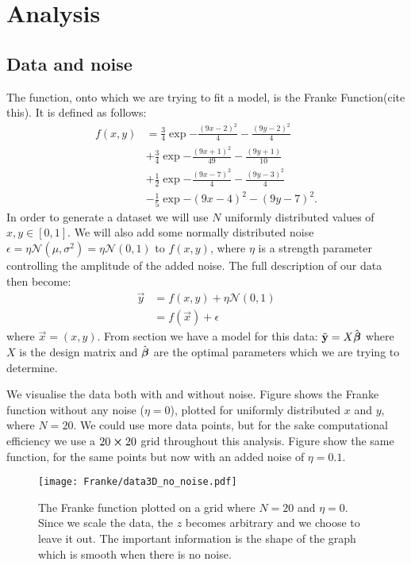 \section{Analysis}\label{sec:analysis}

    \subsection{Data and noise}\label{sec:data}
        The function, onto which we are trying to fit a model, is the Franke Function(cite this). It is defined as follows:
        \begin{align}\label{eq:francefunc}
            f(x,y) &= \frac{3}{4}\exp{-\frac{(9x-2)^2}{4}-\frac{(9y-2)^2}{4}} \nonumber\\
            &+ \frac{3}{4}\exp{-\frac{(9x+1)^2}{49}-\frac{(9y+1)}{10}} \nonumber\\
            &+ \frac{1}{2}\exp{-\frac{(9x-7)^2}{4}-\frac{(9y-3)^2}{4}} \nonumber\\
            &-\frac{1}{5}\exp{-(9x-4)^2-(9y-7)^2}.
        \end{align}
        In order to generate a dataset we will use $N$ uniformly distributed values of $x,y\in[0,1]$. We will also add some normally distributed noise $\epsilon = \eta\mathcal{N}(\mu,\sigma^2) = \eta\mathcal{N}(0,1)$ to $f(x,y)$, where $\eta$ is a strength parameter controlling the amplitude of the added noise. The full description of our data then become:
        \begin{align}\label{eq:datadescription}
            \vec{y} &= f(x,y) + \eta\mathcal{N}(0,1) \nonumber \\
            &= f(\vec{x}) + \epsilon
        \end{align}
        where $\vec{x} = (x,y)$. 
        From section  we have a model for this data: $\tilde{\mathbf{y}} = X\hat{\boldsymbol{\beta}}$ where $X$ is the design matrix and $\hat{\boldsymbol{\beta}}$ are the optimal parameters which we are trying to determine. 

        We visualise the data both with and without noise. Figure  shows the Franke function without any noise ($\eta=0$), plotted for uniformly distributed $x$ and $y$, where $N=20$. We could use more data points, but for the sake computational efficiency we use a $20\cross20$ grid throughout this analysis.  Figure  show the same function, for the same points but now with an added noise of $\eta=0.1$.

        \begin{figure}
            \texttt{[image: Franke/data3D\_no\_noise.pdf]}
            \caption{The Franke function plotted on a grid where $N=20$ and $\eta=0$. Since we scale the data, the $z$ becomes arbitrary and we choose to leave it out. The important information is the shape of the graph which is smooth when there is no noise. }
            \label{fig:franke_function}
        \end{figure}

